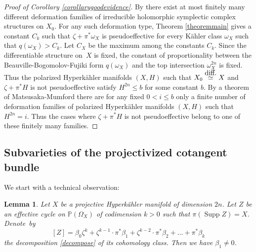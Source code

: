 \documentclass[11pt]{article}
\theoremstyle{plain}
\newtheorem{lemma}[theorem]{Lemma}
\theoremstyle{definition}
\newcommand{\PP}{\ensuremath{\mathbb{P}}}
\DeclareMathOperator{\supp}{Supp}
\begin{document}
\begin{proof}[Proof of Corollary \ref{corollarygoodevidence}]
By \cite[Th.\,2.1]{Huy03b} there exist at most finitely many
different deformation families of irreducible holomorphic symplectic complex structures on $X_0$.
For any such deformation type, Theorem \ref{theoremmain} gives a constant $C_k$ such that $\zeta + \pi^* \omega_{X}$ is pseudoeffective for every Kähler class $\omega_X$ such that $q(\omega_{X})>C_k$. Let $C_X$ be the maximum among the constants $C_k$. Since the differentiable structure on~$X$ is fixed, the constant of proportionality between the Beauville-Bogomolov-Fujiki form $q(\omega_X)$ and the top intersection $\omega_X^{2n}$ is fixed.
Thus the polarized Hyperkähler manifolds $(X, H)$ such that
$X_0 \stackrel{\mbox{\tiny diff.}}{\simeq} X$ and $\zeta + \pi^* H$ is not pseudoeffective satisfy $H^{2n} \leq b$
for some constant $b$. By a theorem of Matsusaka-Mumford \cite{MM64}
there are for any fixed $0 < i\leq b$ only a finite number of deformation families
of polarized Hyperkähler manifolds $(X, H)$ such that $H^{2n}=i$.
Thus the cases where $\zeta + \pi^* H$ is not pseudoeffective belong to one of these finitely many families.
\end{proof}

\subsection{Subvarieties of the projectivized cotangent bundle} \label{subsectionsubvarieties}

We start with a technical observation:

\begin{lemma} \label{lemmakey}
Let $X$ be a projective Hyperkähler manifold of dimension $2n$.
Let $Z$ be an effective cycle on $\PP(\Omega_X)$
of codimension $k\!>\!0$ such that $\pi(\supp Z)\!=\! X$. Denote~by
\[
[Z]= \beta_0 \zeta^k + \zeta^{k-1}\cdot \pi^* \beta_1 + \zeta^{k-2}\cdot \pi^* \beta_2 + \ldots + \pi^* \beta_k
\]
the decomposition \eqref{decompose} of its cohomology class. Then we have $\beta_1 \neq 0$.
\end{lemma}
\end{document}
